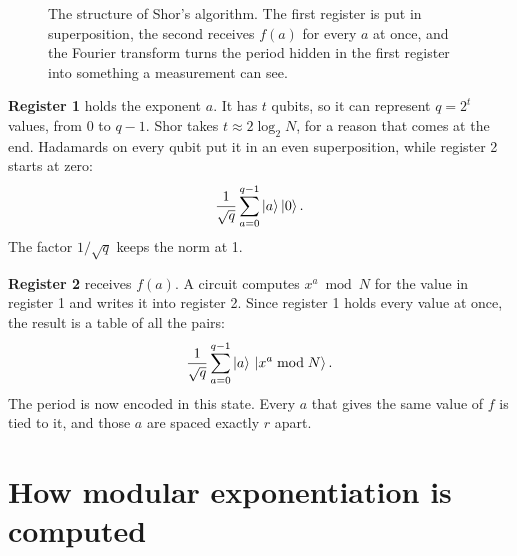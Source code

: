 \begin{figure}[htbp]
\centering
{}
\caption{The structure of Shor's algorithm. The first register is put in
superposition, the second receives $f(a)$ for every $a$ at once, and the Fourier
transform turns the period hidden in the first register into something a
measurement can see.}
\end{figure}

\textbf{Register 1} holds the exponent $a$. It has $t$ qubits, so it can represent
$q = 2^t$ values, from $0$ to $q - 1$. Shor takes $t \approx 2\log_2 N$, for a
reason that comes at the end. Hadamards on every qubit put it in an even
superposition, while register 2 starts at zero:
\[
  \frac{1}{\sqrt q}\sum_{a=0}^{q-1} \ket{a}\ket{0}.
\]
The factor $1/\sqrt q$ keeps the norm at 1.

\textbf{Register 2} receives $f(a)$. A circuit computes $x^a \bmod N$ for the value
in register 1 and writes it into register 2. Since register 1 holds every value
at once, the result is a table of all the pairs:
\[
  \frac{1}{\sqrt q}\sum_{a=0}^{q-1} \ket{a}\,\ket{x^a \bmod N}.
\]
The period is now encoded in this state. Every $a$ that gives the same value of
$f$ is tied to it, and those $a$ are spaced exactly $r$ apart.

\section{How modular exponentiation is computed}

